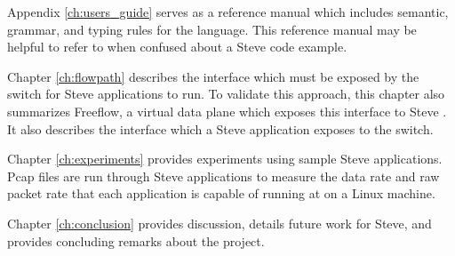 Appendix \ref{ch:users_guide} serves as a reference
manual which includes semantic, grammar, and typing rules for the language.
This reference manual may be helpful to refer to when confused about a
Steve code example.

Chapter \ref{ch:flowpath} describes the interface which must be exposed by the switch for Steve applications to run. To validate this approach, this chapter also summarizes Freeflow, a virtual data plane which exposes this interface to Steve \cite{freeflow_software}. It also describes the interface which a Steve application exposes to the switch.

Chapter \ref{ch:experiments} provides experiments using sample Steve
applications. Pcap files are run through Steve applications to measure the data
rate and raw packet rate that each application is capable of running at on a
Linux machine.

Chapter \ref{ch:conclusion} provides discussion, details future work for Steve, and provides concluding remarks about the project.